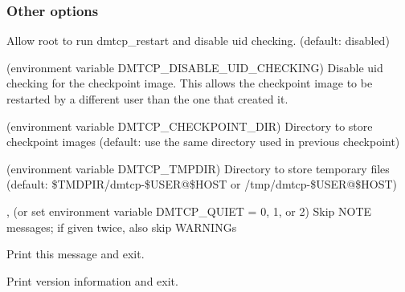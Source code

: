 \subsubsection{Other options}
\begin{Description}
  \item[\Opt{--run-as-root}]
    Allow root to run dmtcp_restart and disable uid checking.
    (default: disabled)

  \item[\Opt{--no-strict-uid-checking} (environment variable DMTCP_DISABLE_UID_CHECKING)]
    Disable uid checking for the checkpoint image. This allows the checkpoint image
    to be restarted by a different user than the one that created it.

  \item[\OptSArg{--ckptdir}{path} (environment variable DMTCP_CHECKPOINT_DIR)]
    Directory to store checkpoint images (default: use the same directory used in previous checkpoint)

  \item[\OptSArg{--tmpdir}{path} (environment variable DMTCP_TMPDIR)]
    Directory to store temporary files
    (default: \$TMDPIR/dmtcp-\$USER@\$HOST or /tmp/dmtcp-\$USER@\$HOST)

  \item[\Opt{-q}, \Opt{--quiet} (or set environment variable DMTCP_QUIET = 0, 1, or 2)]
    Skip NOTE messages; if given twice, also skip WARNINGs

  \item[\Opt{--help}] Print this message and exit.

  \item[\Opt{--version}] Print version information and exit.
\end{Description}
